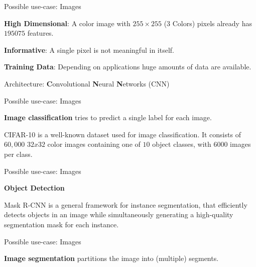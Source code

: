 \documentclass[11pt,compress,t,notes=noshow, xcolor=table]{beamer}
\begin{document}
\begin{frame}{Possible use-case: Images}
\begin{itemizeM}
\item \textbf{High Dimensional}: A color image with $255 \times 255$ (3 Colors) pixels already has $195075$ features.
\item \textbf{Informative}: A single pixel is not meaningful in itself.
\item \textbf{Training Data}: Depending on applications huge amounts of data are available.
\end{itemizeM}
Architecture: \textbf{C}onvolutional \textbf{N}eural \textbf{N}etworks (CNN)
\end{frame}


\begin{framei} {Possible use-case: Images}
\item \textbf{Image classification} tries to predict a single label for each image.
\item \footnotesize CIFAR-10 is a well-known dataset used for image classification. It consists of $60,000$ $32x32$ color images containing one of $10$ object classes, with $6000$ images per class. 
\end{framei}


\begin{framei} {Possible use-case: Images}
\item \textbf{Object Detection}
\item \footnotesize Mask R-CNN is a general framework for instance segmentation, that efficiently detects objects in an image while simultaneously generating a high-quality segmentation mask for each instance.
\end{framei}

\begin{framei} {Possible use-case: Images}
\item \textbf{Image segmentation} partitions the image into (multiple) segments.
\end{framei}
\end{document}
